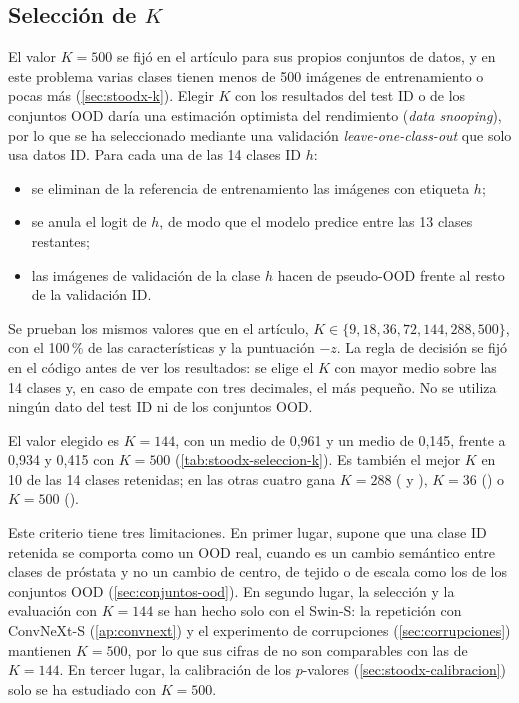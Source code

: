 
\subsection{Selección de \texorpdfstring{$K$}{K}}\label{sec:stoodx-seleccion-k}

El valor $K = 500$ se fijó en el artículo para sus propios conjuntos de datos, y en este problema varias clases tienen menos de 500 imágenes de entrenamiento o pocas más (\cref{sec:stoodx-k}). Elegir $K$ con los resultados del test ID o de los conjuntos OOD daría una estimación optimista del rendimiento (\emph{data snooping}), por lo que se ha seleccionado mediante una validación \emph{leave-one-class-out} que solo usa datos ID. Para cada una de las 14 clases ID $h$:
\begin{itemize}
  \item se eliminan de la referencia de entrenamiento las imágenes con etiqueta $h$;
  \item se anula el logit de $h$, de modo que el modelo predice entre las 13 clases restantes;
  \item las imágenes de validación de la clase $h$ hacen de pseudo-OOD frente al resto de la validación ID.
\end{itemize}
Se prueban los mismos valores que en el artículo, $K \in \{9, 18, 36, 72, 144, 288, 500\}$, con el 100\,\% de las características y la puntuación $-z$. La regla de decisión se fijó en el código antes de ver los resultados: se elige el $K$ con mayor \AUROC medio sobre las 14 clases y, en caso de empate con tres decimales, el más pequeño. No se utiliza ningún dato del test ID ni de los conjuntos OOD.



El valor elegido es $K = 144$, con un \AUROC medio de 0,961 y un  medio de 0,145, frente a 0,934 y 0,415 con $K = 500$ (\cref{tab:stoodx-seleccion-k}). Es también el mejor $K$ en 10 de las 14 clases retenidas; en las otras cuatro gana $K = 288$ ( y ), $K = 36$ () o $K = 500$ ().

Este criterio tiene tres limitaciones. En primer lugar, supone que una clase ID retenida se comporta como un OOD real, cuando es un cambio semántico entre clases de próstata y no un cambio de centro, de tejido o de escala como los de los conjuntos OOD (\cref{sec:conjuntos-ood}). En segundo lugar, la selección y la evaluación con $K = 144$ se han hecho solo con el Swin-S: la repetición con ConvNeXt-S (\cref{ap:convnext}) y el experimento de corrupciones (\cref{sec:corrupciones}) mantienen $K = 500$, por lo que sus cifras de \stoodx no son comparables con las de $K = 144$. En tercer lugar, la calibración de los $p$-valores (\cref{sec:stoodx-calibracion}) solo se ha estudiado con $K = 500$.

